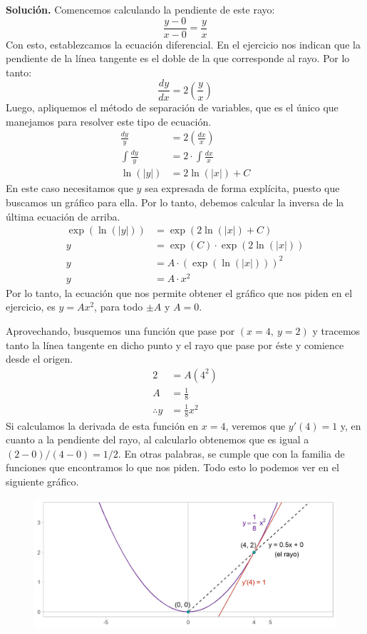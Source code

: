 \documentclass[12pt]{article}
\begin{document}
\textbf{Solución.} \quad Comencemos calculando la pendiente de este rayo:
\[
  \frac{y - 0}{x - 0} = \frac{y}{x}
\]
Con esto, establezcamos la ecuación diferencial. En el ejercicio nos indican que la pendiente de la línea tangente es el doble de la que corresponde al rayo. Por lo tanto:
\[
  \frac{dy}{dx} = 2 \left(\frac{y}{x}\right)
\]
Luego, apliquemos el método de separación de variables, que es el único que manejamos para resolver este tipo de ecuación.
\begin{align*}
  \frac{dy}{y} &= 2 \left(\frac{dx}{x}\right) \\
  \int \frac{dy}{y} &= 2 \cdot \int \frac{dx}{x} \\
  \ln(\lvert y \rvert) &= 2 \ln(\lvert x \rvert) + C
\end{align*}
En este caso necesitamos que $y$ sea expresada de forma explícita, puesto que buscamos un gráfico para ella. Por lo tanto, debemos calcular la inversa de la última ecuación de arriba.
\begin{align*}
  \exp(\ln(\lvert y \rvert)) &= \exp(2 \ln(\lvert x \rvert) + C) \\
  y &= \exp(C) \cdot \exp(2 \ln(\lvert x \rvert)) \\
  y &= A \cdot (\exp(\ln(\lvert x \rvert)))^{2} \\
  y &= A \cdot x^{2}
\end{align*}
Por lo tanto, la ecuación que nos permite obtener el gráfico que nos piden en el ejercicio, es $y = Ax^{2}$, para todo $\pm A$ y $A = 0$.

Aprovechando, busquemos una función que pase por $(x = 4, \ y = 2)$ y tracemos tanto la línea tangente en dicho punto y el rayo que pase por éste y comience desde el origen.
\begin{align*}
2 &= A (4^{2}) \\
A &= \frac{1}{8} \\
\therefore y &= \frac{1}{8} x^{2}
\end{align*}
Si calculamos la derivada de esta función en $x = 4$, veremos que $y'(4) = 1$ y, en cuanto a la pendiente del rayo, al calcularlo obtenemos que es igual a $(2 - 0)/(4 - 0) = 1/2$. En otras palabras, se cumple que con la familia de funciones que encontramos lo que nos piden. Todo esto lo podemos ver en el siguiente gráfico.

\newpage

\begin{figure}[hbt!]
\centering
\includegraphics[scale=0.7]{img/diff_eq_exer_2.jpg}
\end{figure}
\end{document}
